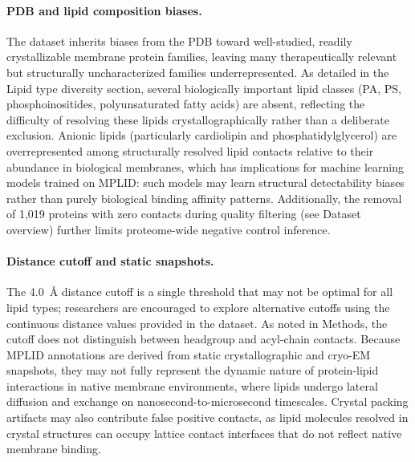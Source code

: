\documentclass[unnumsec,webpdf,contemporary,large]{oup-authoring-template}
\begin{document}
\paragraph{PDB and lipid composition biases.} The dataset inherits biases from the PDB toward well-studied, readily crystallizable membrane protein families, leaving many therapeutically relevant but structurally uncharacterized families underrepresented. As detailed in the Lipid type diversity section, several biologically important lipid classes (PA, PS, phosphoinositides, polyunsaturated fatty acids) are absent, reflecting the difficulty of resolving these lipids crystallographically rather than a deliberate exclusion. Anionic lipids (particularly cardiolipin and phosphatidylglycerol) are overrepresented among structurally resolved lipid contacts relative to their abundance in biological membranes, which has implications for machine learning models trained on MPLID: such models may learn structural detectability biases rather than purely biological binding affinity patterns. Additionally, the removal of 1,019 proteins with zero contacts during quality filtering (see Dataset overview) further limits proteome-wide negative control inference.

\paragraph{Distance cutoff and static snapshots.} The 4.0~\AA{} distance cutoff is a single threshold that may not be optimal for all lipid types; researchers are encouraged to explore alternative cutoffs using the continuous distance values provided in the dataset. As noted in Methods, the cutoff does not distinguish between headgroup and acyl-chain contacts. Because MPLID annotations are derived from static crystallographic and cryo-EM snapshots, they may not fully represent the dynamic nature of protein-lipid interactions in native membrane environments, where lipids undergo lateral diffusion and exchange on nanosecond-to-microsecond timescales. Crystal packing artifacts may also contribute false positive contacts, as lipid molecules resolved in crystal structures can occupy lattice contact interfaces that do not reflect native membrane binding.
\end{document}
